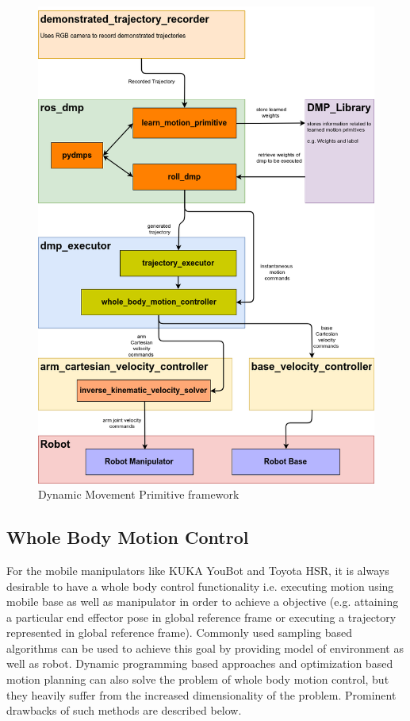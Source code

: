 \newpage
\begin{figure}[H]
	\includegraphics[width=\textwidth]{images/framework.png}
	\caption{Dynamic Movement Primitive framework}
	\label{fig:framework}
\end{figure}

\subsection{Whole Body Motion Control}

For the mobile manipulators like KUKA YouBot and Toyota HSR, it is always desirable to have a whole body control functionality i.e. executing motion using mobile base as well as manipulator in order to achieve a objective (e.g. attaining a particular end effector pose in global reference frame or executing a trajectory represented in global reference frame). Commonly used sampling based algorithms can be used to achieve this goal by providing model of environment as well as robot. Dynamic programming based approaches and optimization based motion planning can also solve the problem of whole body motion control, but they heavily suffer from the increased dimensionality of the problem. Prominent drawbacks of such methods are described below. 

